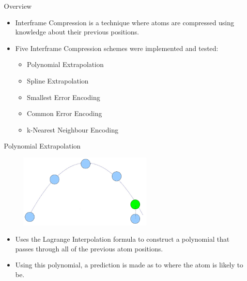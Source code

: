 \documentclass{beamer}
\begin{document}
\begin{frame}{Overview}
\begin{itemize}
 \item Interframe Compression is a technique where atoms are compressed using
   knowledge about their previous positions.

 \item Five Interframe Compression schemes were implemented and tested:
 \begin{itemize}
   \item Polynomial Extrapolation
   \item Spline Extrapolation
   \item Smallest Error Encoding
   \item Common Error Encoding
   \item k-Nearest Neighbour Encoding
 \end{itemize}
\end{itemize}
\end{frame}

\begin{frame}{Polynomial Extrapolation}
  \begin{figure}[h]
    \centering \includegraphics[width=0.6\textwidth]{julian-images/p1.png}
  \end{figure}
\begin{itemize}
 \item Uses the Lagrange Interpolation formula to construct a polynomial that
   passes through all of the previous atom positions.

 \item Using this polynomial, a prediction is made as to where the atom is
   likely to be.
\end{itemize}
\end{frame}
\end{document}
